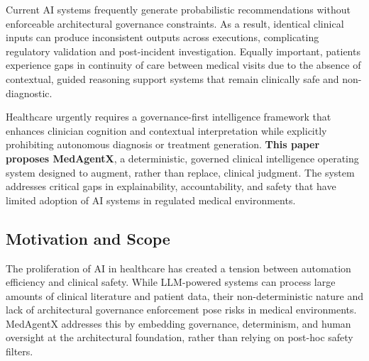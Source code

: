 \documentclass[journal]{IEEEtran}
\begin{document}
Current AI systems frequently generate probabilistic recommendations without enforceable architectural governance constraints. As a result, identical clinical inputs can produce inconsistent outputs across executions, complicating regulatory validation and post-incident investigation. Equally important, patients experience gaps in continuity of care between medical visits due to the absence of contextual, guided reasoning support systems that remain clinically safe and non-diagnostic.

Healthcare urgently requires a governance-first intelligence framework that enhances clinician cognition and contextual interpretation while explicitly prohibiting autonomous diagnosis or treatment generation. \textbf{This paper proposes MedAgentX}, a deterministic, governed clinical intelligence operating system designed to augment, rather than replace, clinical judgment. The system addresses critical gaps in explainability, accountability, and safety that have limited adoption of AI systems in regulated medical environments.

\subsection{Motivation and Scope}
The proliferation of AI in healthcare has created a tension between automation efficiency and clinical safety. While LLM-powered systems can process large amounts of clinical literature and patient data, their non-deterministic nature and lack of architectural governance enforcement pose risks in medical environments. MedAgentX addresses this by embedding governance, determinism, and human oversight at the architectural foundation, rather than relying on post-hoc safety filters.
\end{document}
